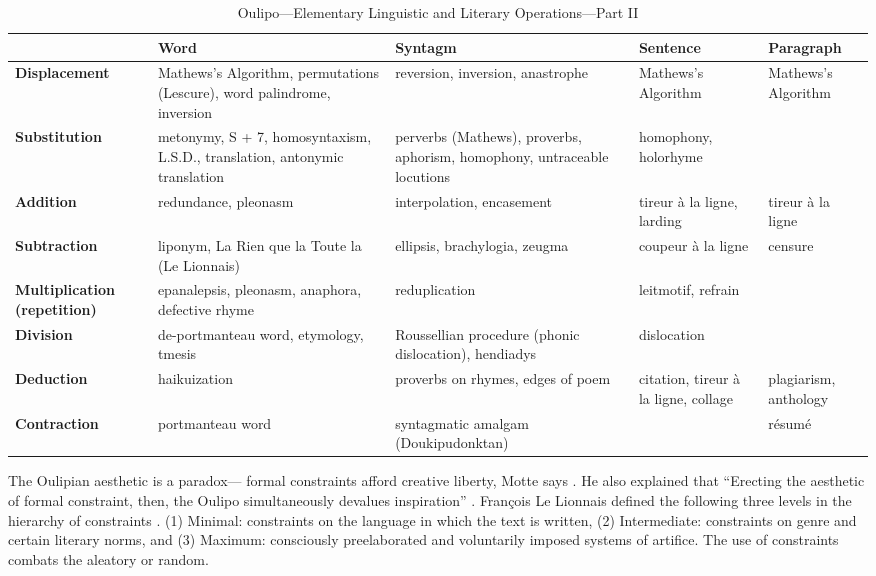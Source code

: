 \begin{table}[!htbp]
\caption[Oulipo Operations II]{Oulipo---Elementary Linguistic and Literary Operations---Part II}
\label{tab:oulipo2}
{\footnotesize
\begin{tabu}{X[l,0.85]X[l,1.2]X[l,1.2]X[l,0.7]X[l,0.7]}
  \toprule
  & \textbf{Word}
  & \textbf{Syntagm}
  & \textbf{Sentence}
  & \textbf{Paragraph}
  \\ \midrule
  \textbf{Displacement} 
  & Mathews's Algorithm, permutations (Lescure), word palindrome, inversion
  & reversion, inversion, anastrophe
  & Mathews's Algorithm
  & Mathews's Algorithm
  \\
  \textbf{Substitution} 
  & metonymy, S + 7, homosyntaxism, L.S.D., translation, antonymic translation
  & perverbs (Mathews), proverbs, aphorism, homophony, untraceable locutions
  & homophony, holorhyme
  &
  \\
  \textbf{Addition} 
  & redundance, pleonasm
  & interpolation, encasement
  & tireur {\`a} la ligne, larding
  & tireur {\`a} la ligne
  \\
  \textbf{Subtraction} 
  & liponym, La Rien que la Toute la (Le Lionnais)
  & ellipsis, brachylogia, zeugma
  & coupeur {\`a} la ligne
  & censure
  \\
  \textbf{Multiplication (repetition)} 
  & epanalepsis, pleonasm, anaphora, defective rhyme
  & reduplication
  & leitmotif, refrain
  &
  \\
  \textbf{Division} 
  & de-portmanteau word, etymology, tmesis 
  & Roussellian procedure (phonic dislocation), hendiadys
  & dislocation
  &
  \\
  \textbf{Deduction} 
  & haikuization
  & proverbs on rhymes, edges of poem
  & citation, tireur {\`a} la ligne, collage
  & plagiarism, anthology
  \\
  \textbf{Contraction}
  & portmanteau word
  & syntagmatic amalgam (Doukipudonktan)
  &
  & r{\'e}sum{\'e}
  \\
  \bottomrule
\end{tabu}
}
\end{table}

The Oulipian aesthetic is a paradox--- formal constraints afford creative liberty, Motte says \citeyear[p.18]{Motte2007}. He also explained that ``Erecting the aesthetic of formal constraint, then, the Oulipo simultaneously devalues inspiration'' \autocite[p.10]{Motte2007}. François Le Lionnais defined the following three levels in the hierarchy of constraints \autocite[p.11]{Motte2007}. (1) Minimal: constraints on the language in which the text is written, (2) Intermediate: constraints on genre and certain literary norms, and (3) Maximum: consciously preelaborated and voluntarily imposed systems of artifice. The use of constraints combats the aleatory or random.

